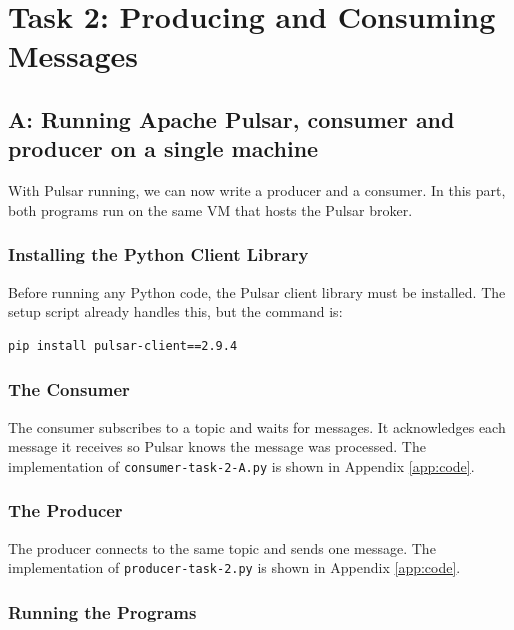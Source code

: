 \documentclass[11pt,a4paper]{article}
\begin{document}
\newpage

\section{Task 2: Producing and Consuming Messages}

\subsection{A: Running Apache Pulsar, consumer and producer on a single
machine}

With Pulsar running, we can now write a producer and a consumer. In this part,
both programs run on the same VM that hosts the Pulsar broker.

\subsubsection{Installing the Python Client Library}

Before running any Python code, the Pulsar client library must be installed.
The setup script already handles this, but the command is:

\begin{lstlisting}[style=shell]
pip install pulsar-client==2.9.4
\end{lstlisting}

\subsubsection{The Consumer}

The consumer subscribes to a topic and waits for messages. It acknowledges
each message it receives so Pulsar knows the message was processed.
The implementation of \texttt{consumer-task-2-A.py} is shown in Appendix \ref{app:code}.

\subsubsection{The Producer}

The producer connects to the same topic and sends one message.
The implementation of \texttt{producer-task-2.py} is shown in Appendix \ref{app:code}.

\subsubsection{Running the Programs}
\end{document}
